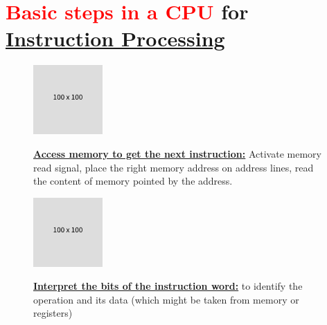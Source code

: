 \documentclass[
  14pt,
  a4paper,
  DIV=11,
  numbers=noendperiod,
  headinclude=true,
  footinclude=true]{scrreprt}
\begin{document}
\section{\texorpdfstring{\textcolor{red}{Basic steps in a CPU} for
\underline{Instruction Processing}}{Basic steps in a CPU for }}\label{basic-steps-in-a-cpu-for}

\begin{figure}[H]

\begin{minipage}{0.30\linewidth}

\includegraphics{index_files/mediabag/FiKGhYhhIWJYiBgWIoaF.png}\end{minipage}%
%
\begin{minipage}{0.70\linewidth}

\begin{tcolorbox}[colback=boxbodycol, colframe=boxheadcol, colbacktitle=boxheadcol, title=\textcolor{red}{\underline{\textbf{Fetching}}}]
\underline{\textbf{Access memory to get the next instruction:}} Activate
memory read signal, place the right memory address on address lines,
read the content of memory pointed by the address.

\end{tcolorbox}

\end{minipage}%

\end{figure}%

\begin{figure}[H]

\begin{minipage}{0.30\linewidth}

\includegraphics{index_files/mediabag/FiKGhYhhIWJYiBgWIoaF.png}\end{minipage}%
%
\begin{minipage}{0.70\linewidth}

\begin{tcolorbox}[colback=boxbodycol, colframe=boxheadcol, colbacktitle=boxheadcol, title=\textcolor{red}{\underline{\textbf{Decoding}}}]
\underline{\textbf{Interpret the bits of the instruction word:}} to
identify the operation and its data (which might be taken from memory or
registers)

\end{tcolorbox}

\end{minipage}%

\end{figure}%
\end{document}
